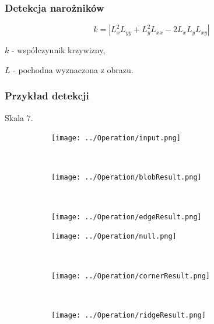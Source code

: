 \begin{frame}
	\frametitle{Detekcja narożników}



	$$ k = |L_x^2L_{yy}  + L_y^2L_{xx} - 2L_xL_yL_{xy}| $$

	$ k $ - współczynnik krzywizny,

	$ L $ - pochodna wyznaczona z obrazu.



\end{frame}
\begin{frame}
	\frametitle{Przykład detekcji}
Skala 7.
	\begin{figure}[h]
		\begin{center}

			\begin{subfigure}[b]{3cm}
				\centering
				\texttt{[image: ../Operation/input.png]}
			\end{subfigure}~
			\begin{subfigure}[b]{3cm}
				\centering
				\texttt{[image: ../Operation/blobResult.png]}
			\end{subfigure}~
			\begin{subfigure}[b]{3cm}
				\centering
				\texttt{[image: ../Operation/edgeResult.png]}
			\end{subfigure}

			\begin{subfigure}[b]{3cm}
				\centering
				\texttt{[image: ../Operation/null.png]}
			\end{subfigure}~
			\begin{subfigure}[b]{3cm}
				\centering
				\texttt{[image: ../Operation/cornerResult.png]}
			\end{subfigure}~
			\begin{subfigure}[b]{3cm}
				\centering
				\texttt{[image: ../Operation/ridgeResult.png]}
			\end{subfigure}
			\label{fig:wynik}
		\end{center}
	\end{figure}

\end{frame}
